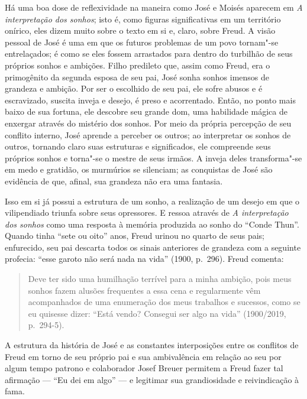 Há uma boa dose de reflexividade na maneira como José e Moisés aparecem
em \emph{A interpretação dos sonhos}; isto é, como figuras
significativas em um território onírico, eles dizem muito sobre o texto
em si e, claro, sobre Freud. A visão pessoal de José é uma em que os
futuros problemas de um povo tornam"-se entrelaçados; é como se eles
fossem arrastados para dentro do turbilhão de seus próprios sonhos e
ambições. Filho predileto que, assim como Freud, era o primogênito da
segunda esposa de seu pai, José sonha sonhos imensos de grandeza e
ambição. Por ser o escolhido de seu pai, ele sofre abusos e é
escravizado, suscita inveja e desejo, é preso e acorrentado. Então, no
ponto mais baixo de sua fortuna, ele descobre seu grande dom, uma
habilidade mágica de enxergar através do mistério dos sonhos. Por meio
da própria percepção de seu conflito interno, José aprende a perceber os
outros; ao interpretar os sonhos de outros, tornando claro suas
estruturas e significados, ele compreende seus próprios sonhos e
torna"-se o mestre de seus irmãos. A inveja deles transforma"-se em medo e
gratidão, os murmúrios se silenciam; as conquistas de José são evidência
de que, afinal, sua grandeza não era uma fantasia.

Isso em si já possui a estrutura de um sonho, a realização de um desejo
em que o vilipendiado triunfa sobre seus opressores. E ressoa através de
\emph{A interpretação dos sonhos} como uma resposta à memória produzida
ao sonho do ``Conde Thun''. Quando tinha ``sete ou oito'' anos, Freud
urinou no quarto de seus pais; enfurecido, seu pai descarta todos os
sinais anteriores de grandeza com a seguinte profecia: ``esse garoto não
será nada na vida'' (1900, p.~296). Freud comenta:

\begin{quote}
Deve ter sido uma humilhação terrível para a minha ambição, pois meus
sonhos fazem alusões frequentes a essa cena e regularmente vêm
acompanhados de uma enumeração dos meus trabalhos e sucessos, como se eu
quisesse dizer: ``Está vendo? Consegui ser algo na vida'' (1900/2019, p.~294-5).
\end{quote}

A estrutura da história de José e as constantes interposições entre os
conflitos de Freud em torno de seu próprio pai e sua ambivalência em
relação ao seu por algum tempo patrono e colaborador Josef Breuer
permitem a Freud fazer tal afirmação --- ``Eu dei em algo'' --- e legitimar
sua grandiosidade e reivindicação à fama.

